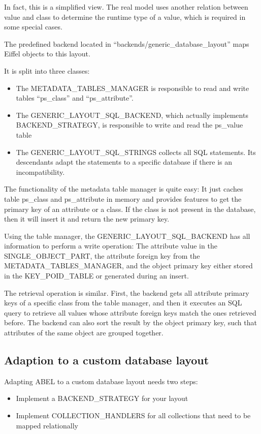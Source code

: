 In fact, this is a simplified view. 
The real model uses another relation between value and class to determine the runtime type of a value, which is required in some special cases.

The predefined backend located in ``backends/generic\_database\_layout'' maps Eiffel objects to this layout.

It is split into three classes:
\begin{itemize}
 \item The METADATA\_TABLES\_MANAGER is responsible to read and write tables ``ps\_class'' and ``ps\_attribute''.
 \item The GENERIC\_LAYOUT\_SQL\_BACKEND, which actually implements BACKEND\_STRATEGY, is responsible to write and read the ps\_value table
 \item The GENERIC\_LAYOUT\_SQL\_STRINGS collects all SQL statements. Its descendants adapt the statements to a specific database if there is an incompatibility.
\end{itemize}

The functionality of the metadata table manager is quite easy:
It just caches table ps\_class and ps\_attribute in memory and provides features to get the primary key of an attribute or a class.
If the class is not present in the database, then it will insert it and return the new primary key.

Using the table manager, the GENERIC\_LAYOUT\_SQL\_BACKEND has all information to perform a write operation:
The attribute value in the SINGLE\_OBJECT\_PART, the attribute foreign key from the METADATA\_TABLES\_MANAGER, and the object primary key either stored in the KEY\_POID\_TABLE or generated during an insert.

The retrieval operation is similar.
First, the backend gets all attribute primary keys of a specific class from the table manager, and then it executes an SQL query to retrieve all values whose attribute foreign keys match the ones retrieved before.
The backend can also sort the result by the object primary key, such that attributes of the same object are grouped together.


\subsection{Adaption to a custom database layout}
\label{subsection:specific_adaption}

Adapting ABEL to a custom database layout needs two steps:
 \begin{itemize}
  \item Implement a BACKEND\_STRATEGY for your layout
  \item Implement COLLECTION\_HANDLERS for all collections that need to be mapped relationally
 \end{itemize}

